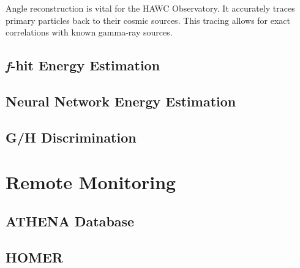 Angle reconstruction is vital for the HAWC Observatory. It accurately traces primary particles back to their cosmic sources. This tracing allows for exact correlations with known gamma-ray sources.

\subsection{\textit{f}-hit Energy Estimation}

\subsection{Neural Network Energy Estimation}

\subsection{G/H Discrimination}
\section{Remote Monitoring}

\subsection{ATHENA Database}

\subsection{HOMER}
